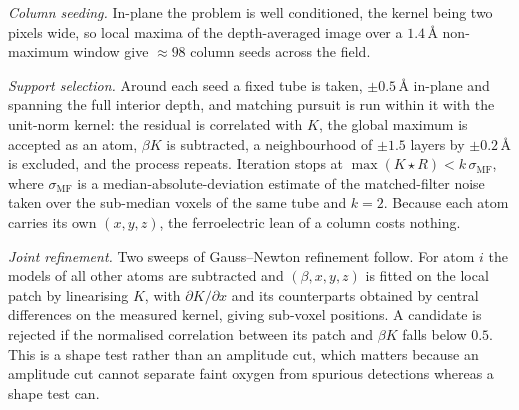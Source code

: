 \documentclass[aps,prb,twocolumn,superscriptaddress,floatfix,nofootinbib]{revtex4-2}
\begin{document}
\emph{Column seeding.} In-plane the problem is well conditioned, the kernel being two pixels
wide, so local maxima of the depth-averaged image over a $1.4$\,\AA{} non-maximum window give
$\approx98$ column seeds across the field.

\emph{Support selection.} Around each seed a fixed tube is taken, $\pm0.5$\,\AA{} in-plane and
spanning the full interior depth, and matching pursuit is run within it with the unit-norm
kernel: the residual is correlated with $K$, the global maximum is accepted as an atom,
$\beta K$ is subtracted, a neighbourhood of $\pm1.5$ layers by $\pm0.2$\,\AA{} is excluded, and
the process repeats. Iteration stops at $\max(K\star R)<k\,\sigma_{\mathrm{MF}}$, where
$\sigma_{\mathrm{MF}}$ is a median-absolute-deviation estimate of the matched-filter noise taken
over the sub-median voxels of the same tube and $k=2$. Because each atom carries its own
$(x,y,z)$, the ferroelectric lean of a column costs nothing.

\emph{Joint refinement.} Two sweeps of Gauss--Newton refinement follow. For atom $i$ the models
of all other atoms are subtracted and $(\beta,x,y,z)$ is fitted on the local patch by linearising
$K$, with $\partial K/\partial x$ and its counterparts obtained by central differences on the
measured kernel, giving sub-voxel positions. A candidate is rejected if the normalised
correlation between its patch and $\beta K$ falls below $0.5$. This is a shape test rather than
an amplitude cut, which matters because an amplitude cut cannot separate faint oxygen from
spurious detections whereas a shape test can.
\end{document}
